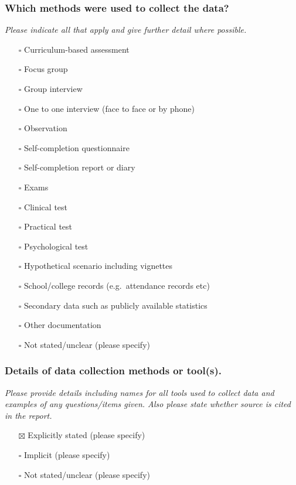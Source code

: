 \documentclass[
  doc, a4paper]{apa7}
\providecommand{\tightlist}{%
  \setlength{\itemsep}{0pt}\setlength{\parskip}{0pt}}
\begin{document}
\subsubsection{Which methods were used to collect the data?}\label{which-methods-were-used-to-collect-the-data}

\emph{Please indicate all that apply and give further detail where possible.}

\begin{itemize}
\tightlist
\item[$\square$]
  Curriculum-based assessment
\item[$\square$]
  Focus group
\item[$\square$]
  Group interview
\item[$\square$]
  One to one interview (face to face or by phone)
\item[$\square$]
  Observation
\item[$\square$]
  Self-completion questionnaire
\item[$\square$]
  Self-completion report or diary
\item[$\square$]
  Exams
\item[$\square$]
  Clinical test
\item[$\square$]
  Practical test
\item[$\square$]
  Psychological test
\item[$\square$]
  Hypothetical scenario including vignettes
\item[$\square$]
  School/college records (e.g.~attendance records etc)
\item[$\square$]
  Secondary data such as publicly available statistics
\item[$\square$]
  Other documentation
\item[$\square$]
  Not stated/unclear (please specify)
\end{itemize}

\subsubsection{Details of data collection methods or tool(s).}\label{details-of-data-collection-methods-or-tools.}

\emph{Please provide details including names for all tools used to collect data and examples of any questions/items given. Also please state whether source is cited in the report.}

\begin{itemize}
\tightlist
\item[$\boxtimes$]
  Explicitly stated (please specify)
\item[$\square$]
  Implicit (please specify)
\item[$\square$]
  Not stated/unclear (please specify)
\end{itemize}
\end{document}

